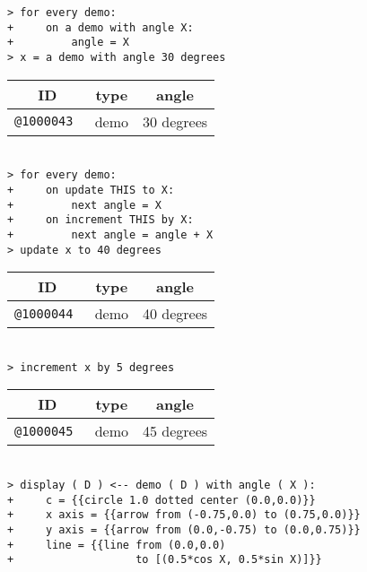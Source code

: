 \documentclass[12pt]{article}
\newenvironment{indpar}[1][0.3in]%
	{\begin{list}{}%
		     {\setlength{\itemsep}{0in}%
		      \setlength{\topsep}{0in}%
		      \setlength{\parsep}{1ex}%
		      \setlength{\labelwidth}{#1}%
		      \setlength{\leftmargin}{#1}%
		      \addtolength{\leftmargin}{\labelsep}}%
	 \item}%
	{\end{list}}
\begin{document}
\begin{indpar}
\verb|> for every demo:| \\
\verb|+     on a demo with angle X:| \\
\verb|+         angle = X| \\
\verb|> x = a demo with angle 30 degrees| \\
\begin{tabular}{|r|r|r|}
\hline
\multicolumn{1}{|c}{\bf ID} &
\multicolumn{1}{|c}{\bf type} &
\multicolumn{1}{|c|}{\bf angle} \\
\hline
\tt @1000043 & demo & 30 degrees \\
\hline
\end{tabular} \\[0.5ex]
\verb|> for every demo:| \\
\verb|+     on update THIS to X:|\\
\verb|+         next angle = X| \\
\verb|+     on increment THIS by X:| \\
\verb|+         next angle = angle + X| \\
\verb|> update x to 40 degrees| \\
\begin{tabular}{|r|r|r|}
\hline
\multicolumn{1}{|c}{\bf ID} &
\multicolumn{1}{|c}{\bf type} &
\multicolumn{1}{|c|}{\bf angle} \\
\hline
\tt @1000044 & demo & 40 degrees \\
\hline
\end{tabular} \\[0.5ex]
\verb|> increment x by 5 degrees| \\
\begin{tabular}{|r|r|r|}
\hline
\multicolumn{1}{|c}{\bf ID} &
\multicolumn{1}{|c}{\bf type} &
\multicolumn{1}{|c|}{\bf angle} \\
\hline
\tt @1000045 & demo & 45 degrees \\
\hline
\end{tabular} \\[0.5ex]
\verb/> display ( D ) <-- demo ( D ) with angle ( X ):/ \\
\verb/+     c = {{circle 1.0 dotted center (0.0,0.0)}}/ \\
\verb/+     x axis = {{arrow from (-0.75,0.0) to (0.75,0.0)}}/ \\
\verb/+     y axis = {{arrow from (0.0,-0.75) to (0.0,0.75)}}/ \\
\verb/+     line = {{line from (0.0,0.0)/ \\
\verb/+                   to [(0.5*cos X, 0.5*sin X)]}}/ \\

\end{indpar}
\end{document}
